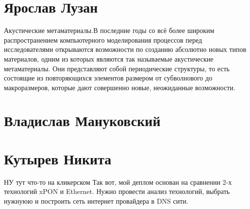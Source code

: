\documentclass{article}
\begin{document}
\section*{Ярослав Лузан}
Акустические метаматериалы.В последние годы со всё более широким распространением компьютерного моделирования процессов перед исследователями открываются возможности по созданию абсолютно новых типов материалов, одним из которых являются так называемые акустические метаматериалы. Они представляют собой периодические структуры, то есть состоящие из повторяющихся элементов размером от субволнового до макроразмеров, которые дают совершенно новые, неожиданные возможности.
\section*{Владислав Мануковский}
\section*{Кутырев Никита}
НУ тут что-то на кликерском
Так вот, мой деплом основан на сравнении 2-х технологий xPON и Ethernet. Нужно провести анализ технологий, выбрать нужнуюю и построить сеть интернет провайдера в DNS сити.
\end{document}
